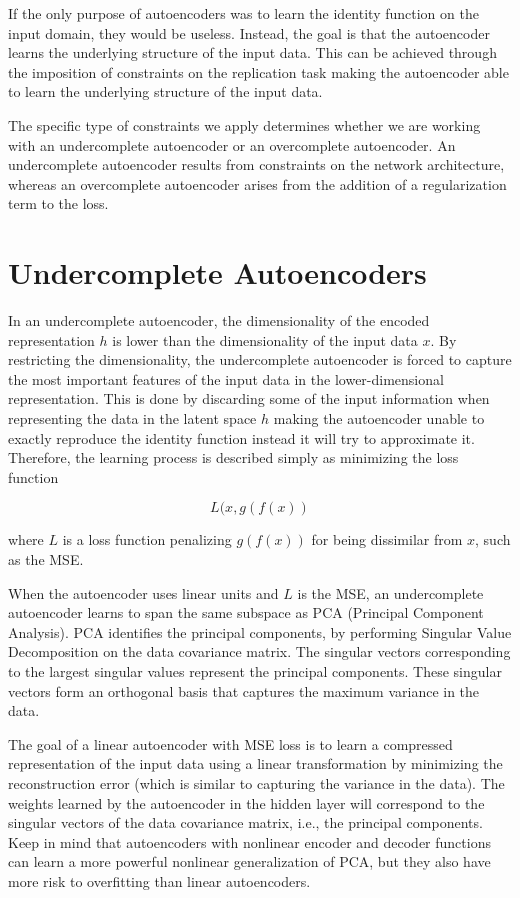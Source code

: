 \noindent If the only purpose of autoencoders was to learn the identity function on the input domain, they would be useless. Instead, the goal is that the autoencoder learns the underlying structure of the input data. This can be achieved through the imposition of constraints on the replication task making the autoencoder able to learn the underlying structure of the input data.

The specific type of constraints we apply determines whether we are working with an undercomplete autoencoder or an overcomplete autoencoder. An undercomplete autoencoder results from constraints on the network architecture, whereas an overcomplete autoencoder arises from the addition of a regularization term to the loss.



\section{Undercomplete Autoencoders}

In an undercomplete autoencoder, the dimensionality of the encoded representation $h$ is lower than the dimensionality of the input data $x$. By restricting the dimensionality, the undercomplete autoencoder is forced to capture the most important features of the input data in the lower-dimensional representation. This is done by discarding some of the input information when representing the data in the latent space $h$ making the autoencoder unable to exactly reproduce the identity function instead it will try to approximate it. Therefore, the learning process is described simply as minimizing the loss function

$$ L(x, g(f(x)) $$

where $L$ is a loss function penalizing $g(f(x))$ for being dissimilar from $x$, such as the MSE.

\noindent When the autoencoder uses linear units and $L$ is the MSE, an undercomplete autoencoder learns to span the same subspace as PCA (Principal Component Analysis). PCA identifies the principal components, by performing Singular Value Decomposition on the data covariance matrix. The singular vectors corresponding to the largest singular values represent the principal components. These singular vectors form an orthogonal basis that captures the maximum variance in the data.

The goal of a linear autoencoder with MSE loss is to learn a compressed representation of the input data using a linear transformation by minimizing the reconstruction error (which is similar to capturing the variance in the data). The weights learned by the autoencoder in the hidden layer will correspond to the singular vectors of the data covariance matrix, i.e., the principal components. Keep in mind that autoencoders with nonlinear encoder and decoder functions can learn a more powerful nonlinear generalization of PCA, but they also have more risk to overfitting than linear autoencoders.


